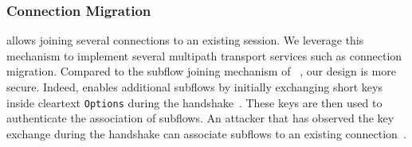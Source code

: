 %


\subsubsection{Connection Migration}\label{sec:multipath}

\tcpls allows joining several \tcp connections to an existing \tcpls session.
We leverage this mechanism to implement several multipath transport services
such as connection migration.
Compared to the subflow joining mechanism of
\mptcp~\cite{raiciu2012hard,hesmans2015smapp,hesmans2016enhanced}, our design is
more secure. Indeed, \mptcp enables additional subflows by initially exchanging 
short keys
inside cleartext \tcp \texttt{Options} during the \tcp handshake~\cite{rfc6824, rfc8684}.
These keys are then used to authenticate the association of subflows.
An attacker that has observed the key exchange during the \tcp handshake can associate
subflows to an existing \mptcp connection~\cite{rfc6181}.


